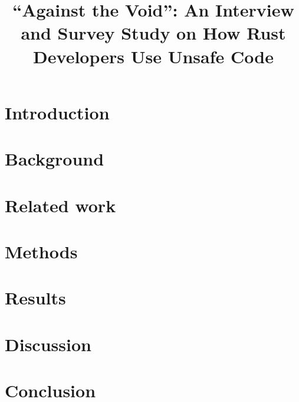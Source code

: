 \documentclass[10pt, conference]{IEEEtran}
\begin{document}
\title{``Against the Void'': An Interview and Survey Study on How Rust Developers Use Unsafe Code}
\newcommand{\linebreakand}{%
  \end{@IEEEauthorhalign}
  \hfill\mbox{}\par
  \mbox{}\hfill\begin{@IEEEauthorhalign}
}
\author{
}

\maketitle
\pagestyle{plain}
\begin{abstract}

\end{abstract}

\section{Introduction}


\section{Background}
\label{section:background}


\section{Related work}
\label{section:related}


\section{Methods}
\label{section:methods}


\section{Results}
\label{section:results}


\section{Discussion}
\label{section:discussion}


\section{Conclusion}
\label{section:conclusion}




\end{document}
